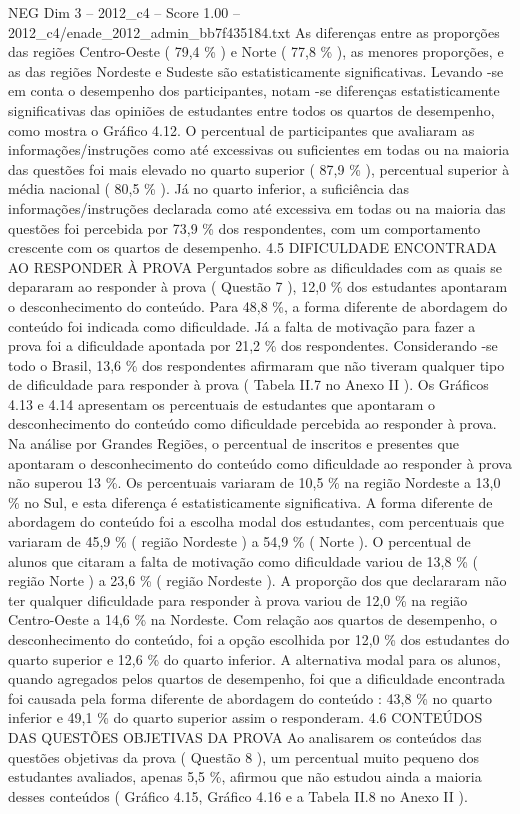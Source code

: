 \begin{textsample}{NEG Dim 3 – 2012\_c4 – Score 1.00 – 2012\_c4/enade\_2012\_admin\_bb7f435184.txt}
As diferenças entre as proporções das regiões Centro-Oeste ( 79,4 \% ) e Norte ( 77,8 \% ), as menores proporções, e as das regiões Nordeste e Sudeste são estatisticamente significativas.
Levando -se em conta o desempenho dos participantes, notam -se diferenças estatisticamente significativas das opiniões de estudantes entre todos os quartos de desempenho, como mostra o Gráfico 4.12.
O percentual de participantes que avaliaram as informações/instruções como até excessivas ou suficientes em todas ou na maioria das questões foi mais elevado no quarto superior ( 87,9 \% ), percentual superior à média nacional ( 80,5 \% ).
Já no quarto inferior, a suficiência das informações/instruções declarada como até excessiva em todas ou na maioria das questões foi percebida por 73,9 \% dos respondentes, com um comportamento crescente com os quartos de desempenho. 4.5 DIFICULDADE ENCONTRADA AO RESPONDER À PROVA Perguntados sobre as dificuldades com as quais se depararam ao responder à prova ( Questão 7 ), 12,0 \% dos estudantes apontaram o desconhecimento do conteúdo.
Para 48,8 \%, a forma diferente de abordagem do conteúdo foi indicada como dificuldade.
Já a falta de motivação para fazer a prova foi a dificuldade apontada por 21,2 \% dos respondentes.
Considerando -se todo o Brasil, 13,6 \% dos respondentes afirmaram que não tiveram qualquer tipo de dificuldade para responder à prova ( Tabela II.7 no Anexo II ).
Os Gráficos 4.13 e 4.14 apresentam os percentuais de estudantes que apontaram o desconhecimento do conteúdo como dificuldade percebida ao responder à prova.
Na análise por Grandes Regiões, o percentual de inscritos e presentes que apontaram o desconhecimento do conteúdo como dificuldade ao responder à prova não superou 13 \%.
Os percentuais variaram de 10,5 \% na região Nordeste a 13,0 \% no Sul, e esta diferença é estatisticamente significativa.
A forma diferente de abordagem do conteúdo foi a escolha modal dos estudantes, com percentuais que variaram de 45,9 \% ( região Nordeste ) a 54,9 \% ( Norte ).
O percentual de alunos que citaram a falta de motivação como dificuldade variou de 13,8 \% ( região Norte ) a 23,6 \% ( região Nordeste ).
A proporção dos que declararam não ter qualquer dificuldade para responder à prova variou de 12,0 \% na região Centro-Oeste a 14,6 \% na Nordeste.
Com relação aos quartos de desempenho, o desconhecimento do conteúdo, foi a opção escolhida por 12,0 \% dos estudantes do quarto superior e 12,6 \% do quarto inferior.
A alternativa modal para os alunos, quando agregados pelos quartos de desempenho, foi que a dificuldade encontrada foi causada pela forma diferente de abordagem do conteúdo : 43,8 \% no quarto inferior e 49,1 \% do quarto superior assim o responderam. 4.6 CONTEÚDOS DAS QUESTÕES OBJETIVAS DA PROVA Ao analisarem os conteúdos das questões objetivas da prova ( Questão 8 ), um percentual muito pequeno dos estudantes avaliados, apenas 5,5 \%, afirmou que não estudou ainda a maioria desses conteúdos ( Gráfico 4.15, Gráfico 4.16 e a Tabela II.8 no Anexo II ).

\end{textsample}
